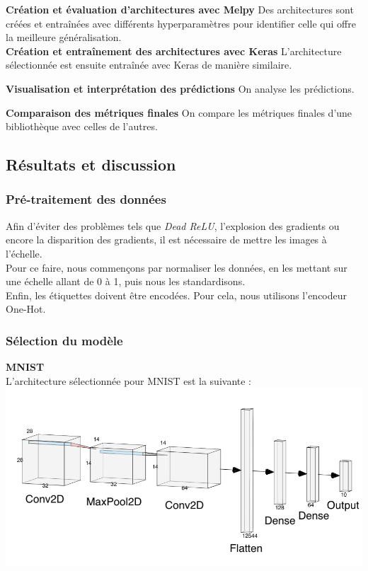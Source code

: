 \begin{multicols}{2}
\textbf{Création et évaluation d’architectures avec Melpy} Des architectures sont créées 
et entraînées avec différents hyperparamètres pour identifier celle qui offre 
la meilleure généralisation.\\

\textbf{Création et entraînement des architectures avec Keras} L'architecture
sélectionnée est ensuite entraînée avec Keras de manière similaire.

\textbf{Visualisation et interprétation des prédictions} On analyse les prédictions. 

\textbf{Comparaison des métriques finales} On compare les métriques finales d'une bibliothèque
avec celles de l'autres.

\subsection{Résultats et discussion}

\subsubsection{Pré-traitement des données}

Afin d’éviter des problèmes tels que \textit{Dead ReLU}, l’explosion des gradients 
ou encore la disparition des gradients, il est nécessaire de mettre les images à l’échelle.\\

Pour ce faire, nous commençons par normaliser les données, en les mettant sur une 
échelle allant de 0 à 1, puis nous les standardisons.\\

Enfin, les étiquettes doivent être encodées. Pour cela, nous utilisons l’encodeur One-Hot.\\

\subsubsection{Sélection du modèle}

\textbf{MNIST} \\

L'architecture sélectionnée pour MNIST est la suivante : \\

\includegraphics[width=\columnwidth]{images/mnist_nn.png}
\hfill\break


\end{multicols}
